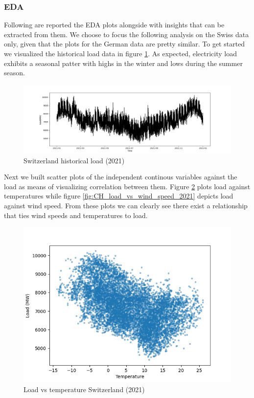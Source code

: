 \subsubsection{EDA}
Following are reported the EDA plots alongside with insights that can be extracted from them. We choose to focus the following analysis on the Swiss data only, given that the plots for the German data are pretty similar.
To get started we visualized the historical load data in figure \ref{fig:CH_historical_load_2021}. As expected, electricity load exhibits a seasonal patter with highs in the winter and lows during the summer season.
\begin{figure}[!h]
    \includegraphics[width=\textwidth]{images/CH_historical_load_2021.png}
    \caption{Switzerland historical load (2021)}
    \label{fig:CH_historical_load_2021}
\end{figure}
Next we built scatter plots of the independent continous variables against the load as means of visualizing correlation between them.
Figure \ref{fig:CH_load_vs_temperature_2021} plots load against temperatures while figure \ref{fig:CH_load_vs_wind_speed_2021} depicts load against wind speed. From these plots we can clearly see there exist a relationship that ties wind speeds and temperatures to load.

\begin{figure}[!h]
    \includegraphics[width=\textwidth]{images/CH_load_vs_temperature_2021.png}
    \caption{Load vs temperature Switzerland (2021)}
    \label{fig:CH_load_vs_temperature_2021}
\end{figure}

